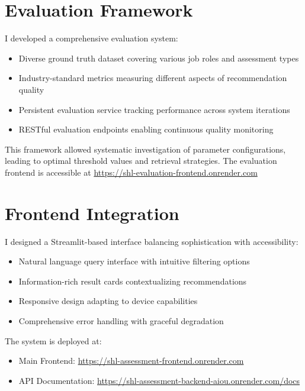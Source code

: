 \documentclass[9pt,a4paper,twocolumn]{article}
\begin{document}
\section{\fontsize{9}{11}\selectfont Evaluation Framework}
\fontsize{8}{10}\selectfont
I developed a comprehensive evaluation system:
\begin{itemize}
    \item Diverse ground truth dataset covering various job roles and assessment types
    \item Industry-standard metrics measuring different aspects of recommendation quality
    \item Persistent evaluation service tracking performance across system iterations
    \item RESTful evaluation endpoints enabling continuous quality monitoring
\end{itemize}

This framework allowed systematic investigation of parameter configurations, leading to optimal threshold values and retrieval strategies. The evaluation frontend is accessible at \url{https://shl-evaluation-frontend.onrender.com}

\section{\fontsize{9}{11}\selectfont Frontend Integration}
\fontsize{8}{10}\selectfont
I designed a Streamlit-based interface balancing sophistication with accessibility:
\begin{itemize}
    \item Natural language query interface with intuitive filtering options
    \item Information-rich result cards contextualizing recommendations
    \item Responsive design adapting to device capabilities
    \item Comprehensive error handling with graceful degradation
\end{itemize}

The system is deployed at:
\begin{itemize}
    \item Main Frontend: \url{https://shl-assessment-frontend.onrender.com}
    \item API Documentation: \url{https://shl-assessment-backend-aiou.onrender.com/docs}
\end{itemize}
\end{document}
